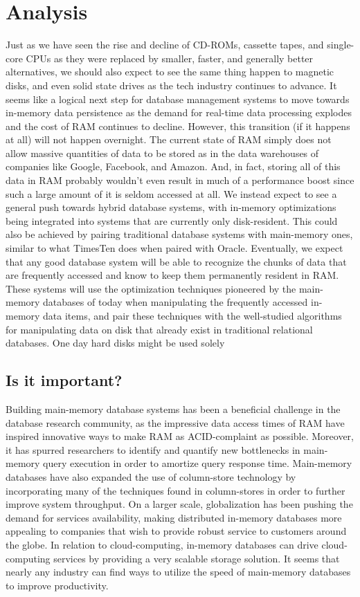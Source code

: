 \documentclass[11pt,a4paper]{report}
\begin{document}
\section{Analysis}
Just as we have seen the rise and decline of CD-ROMs, cassette tapes, and single-core CPUs as they were replaced by smaller, faster, and generally better alternatives, we should also expect to see the same thing happen to magnetic disks, and even solid state drives as the tech industry continues to advance. It seems like a logical next step for database management systems to move towards in-memory data persistence as the demand for real-time data processing explodes and the cost of RAM continues to decline. However, this transition (if it happens at all) will not happen overnight. The current state of RAM simply does not allow massive quantities of data to be stored as in the data warehouses of companies like Google, Facebook, and Amazon. And, in fact, storing all of this data in RAM probably wouldn't even result in much of a performance boost since such a large amount of it is seldom accessed at all. We instead expect to see a general push towards hybrid database systems, with in-memory optimizations being integrated into systems that are currently only disk-resident. This could also be achieved by pairing traditional database systems with main-memory ones, similar to what TimesTen does when paired with Oracle. Eventually, we expect that any good database system will be able to recognize the chunks of data that are frequently accessed and know to keep them permanently resident in RAM. These systems will use the optimization techniques pioneered by the main-memory databases of today when manipulating the frequently accessed in-memory data items, and pair these techniques with the well-studied algorithms for manipulating data on disk that already exist in traditional relational databases. One day hard disks might be used solely 

\subsection{Is it important?}
Building main-memory database systems has been a beneficial challenge in the database research community, as the impressive data access times of RAM have inspired innovative ways to make RAM as ACID-complaint as possible. Moreover, it has spurred researchers to identify and quantify new bottlenecks in main-memory query execution in order to amortize query response time. \cite{ross2004selection} Main-memory databases have also expanded the use of column-store technology by incorporating many of the techniques found in column-stores in order to further improve system throughput.\cite{exasolwp} On a larger scale, globalization has been pushing the demand for services availability, making distributed in-memory databases more appealing to companies that wish to provide robust service to customers around the globe.\cite{gartnerimdb2} In relation to cloud-computing, in-memory databases can drive cloud-computing services by providing a very scalable storage solution. \cite{ousterhout2010case} It seems that nearly any industry can find ways to utilize the speed of main-memory databases to improve productivity.
\end{document}

